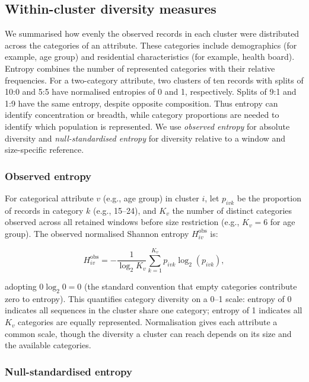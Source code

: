 \subsection{Within-cluster diversity measures}\label{sec:ch6_composition_entropy}

We summarised how evenly the observed records in each cluster were distributed across the categories of an attribute. These categories include demographics (for example, age group) and residential characteristics (for example, health board). Entropy combines the number of represented categories with their relative frequencies. For a two-category attribute, two clusters of ten records with splits of 10:0 and 5:5 have normalised entropies of 0 and 1, respectively. Splits of 9:1 and 1:9 have the same entropy, despite opposite composition. Thus entropy can identify concentration or breadth, while category proportions are needed to identify which population is represented. We use \emph{observed entropy} for absolute diversity and \emph{null-standardised entropy} for diversity relative to a window and size-specific reference.

\subsubsection*{Observed entropy}

For categorical attribute $v$ (e.g., age group) in cluster $i$, let $p_{ivk}$ be the proportion of records in category $k$ (e.g., 15--24), and $K_v$ the number of distinct categories observed across all retained windows before size restriction (e.g., $K_v=6$ for age group). The observed normalised Shannon entropy $H_{iv}^{\mathrm{obs}}$ is:

\[
    H_{iv}^{\mathrm{obs}} = -\frac{1}{\log_2 K_v}\sum_{k=1}^{K_v} p_{ivk}\log_2(p_{ivk}),
\]

adopting $0\log_2 0=0$ (the standard convention that empty categories contribute zero to entropy). This quantifies category diversity on a 0--1 scale: entropy of 0 indicates all sequences in the cluster share one category; entropy of 1 indicates all $K_v$ categories are equally represented. Normalisation gives each attribute a common scale, though the diversity a cluster can reach depends on its size and the available categories.

\subsubsection*{Null-standardised entropy}

